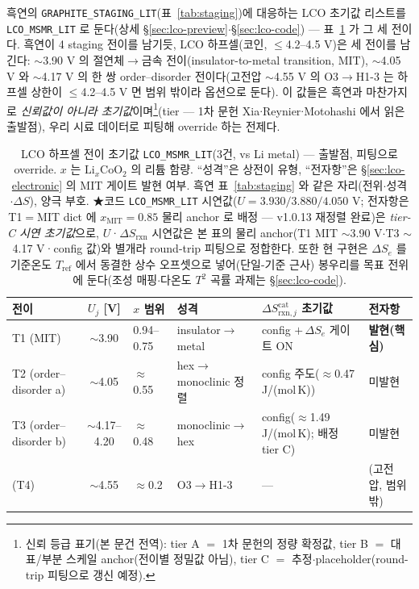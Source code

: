 \documentclass[11pt,a4paper]{article}
\newcommand{\rxn}{\mathrm{rxn}}
\newcommand{\code}[1]{\texttt{#1}}
\begin{document}
흑연의 \code{GRAPHITE\_STAGING\_LIT}(표~\ref{tab:staging})에 대응하는 LCO 초기값 리스트를
\code{LCO\_MSMR\_LIT} 로 둔다(상세 \S\ref{sec:lco-preview}$\cdot$\S\ref{sec:lco-code}) — 표~\ref{tab:lco-staging} 가 그 세 전이다. 흑연이 4 staging 전이를 남기듯, LCO
하프셀(코인, $\le$4.2--4.5 V)은 세 전이를 남긴다\cite{xia2007}: $\sim$3.90 V 의 절연체$\to$금속 전이(insulator-to-metal transition, MIT), $\sim$4.05 V 와
$\sim$4.17 V 의 한 쌍 order--disorder 전이다(고전압 $\sim$4.55 V 의 O3$\to$H1-3 는 하프셀 상한이 $\le$4.2--4.5 V 면
범위 밖이라 옵션으로 둔다). 이 값들은 흑연과 마찬가지로 \emph{신뢰값이 아니라 초기값}이며\footnote{신뢰
등급 표기(본 문건 전역): tier A $=$ 1차 문헌의 정량 확정값, tier B $=$ 대표/부분 스케일 anchor(전이별
정밀값 아님), tier C $=$ 추정$\cdot$placeholder(round-trip 피팅으로 갱신 예정).}(tier — 1차 문헌
Xia\cite{xia2007}$\cdot$Reynier\cite{reynier2004}$\cdot$Motohashi\cite{motohashi2009} 에서 읽은 출발점), 우리 시료 데이터로
피팅해 override 하는 전제다.

\begin{table}[t]
\centering\footnotesize
\renewcommand{\arraystretch}{1.3}
\caption{LCO 하프셀 전이 초기값 \code{LCO\_MSMR\_LIT}(3건, vs Li metal) — 출발점, 피팅으로 override. $x$ 는
$\mathrm{Li}_x\mathrm{CoO_2}$ 의 리튬 함량. ``성격''은 상전이 유형, ``전자항''은 \S\ref{sec:lco-electronic} 의 MIT
게이트 발현 여부. 흑연 표~\ref{tab:staging} 와 같은 자리(전위$\cdot$성격$\cdot\Delta S$), 양극 부호.
★코드 \code{LCO\_MSMR\_LIT} 시연값($U{=}3.930/3.880/4.050$ V; 전자항은 T1$=$MIT dict 에
$x_\mathrm{MIT}{=}0.85$ 물리 anchor 로 배정 — v1.0.13 재정렬 완료)은
\emph{tier-C 시연 초기값}으로, $U$·$\Delta S_\rxn$ 시연값은 본 표의 물리 anchor(T1 MIT $\sim$3.90 V$\cdot$T3 $\sim$4.17 V·config 값)와
별개라 round-trip 피팅으로 정합한다. 또한 현 구현은 $\Delta S_e$ 를 기준온도 $T_\mathrm{ref}$ 에서
동결한 상수 오프셋으로 넣어(단일-기준 근사) 봉우리를 목표 전위에 둔다(조성 매핑$\cdot$다온도 $T^2$ 곡률
과제는 \S\ref{sec:lco-code}).}
\label{tab:lco-staging}
\begin{tabular}{@{}p{} c p{} p{} p{} p{}@{}}
\toprule
전이 & $U_j$ [V] & $x$ 범위 & 성격 & $\Delta S_{\rxn,j}^\mathrm{cat}$ 초기값 & 전자항 \\
\midrule
T1 (MIT)              & $\sim$3.90        & 0.94--0.75 & insulator$\to$metal       & config $+\,\Delta S_e$ 게이트 ON & \textbf{발현(핵심)} \\
T2 (order--disorder a)& $\sim$4.05        & $\approx$0.55 & hex$\to$monoclinic 정렬 & config 주도($\approx$0.47 J/(mol\,K)) & 미발현 \\
T3 (order--disorder b)& $\sim$4.17--4.20  & $\approx$0.48 & monoclinic$\to$hex      & config($\approx$1.49 J/(mol\,K); 배정 tier C) & 미발현 \\
\midrule
(T4)                  & $\sim$4.55        & $\approx$0.2 & O3$\to$H1-3              & --- & (고전압, 범위 밖) \\
\bottomrule
\end{tabular}
\end{table}
\end{document}
